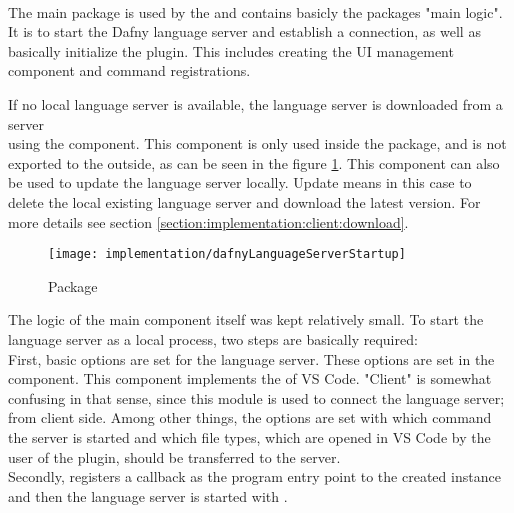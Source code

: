 \textbf{}\\
The main package  is used by the 
and contains basicly the packages "main logic".
It is to start the Dafny language server and establish a connection,
as well as basically initialize the plugin. This includes creating the UI management component and command registrations.

If no local language server is available, the language server is downloaded from a server \\
using the  component.
This component is only used inside the package, and is not exported to the outside,
as can be seen in the figure \ref{fig:placeholder_ref}.
This component can also be used to update the language server locally.
Update means in this case to delete the local existing language server and download the latest version.
For more details see section \ref{section:implementation:client:download}.

\begin{figure}[H]
    \centering
    \texttt{[image: implementation/dafnyLanguageServerStartup]}
    \caption{Package }
    \label{fig:placeholder_ref}
\end{figure}

The logic of the main component  itself was kept relatively small.
To start the language server as a local process, two steps are basically required:\\

First, basic options are set for the language server.
These options are set in the  component. This component implements the 
of VS Code. "Client" is somewhat confusing in that sense, since this module is used to connect the language server; from client side.
Among other things, the options are set with which command the server is started and which file types, which are opened in VS Code by the user of the plugin, should be transferred to the server. \\

Secondly,  registers a callback as the program entry point to the created  instance
and then the language server is started with . \\

\textbf{}\\


